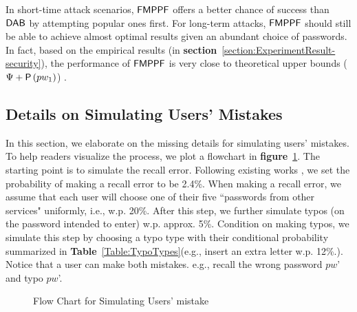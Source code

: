In short-time attack scenarios, $\mathsf{FMPPF}$ offers a better chance of success than $\mathsf{DAB}$ by attempting popular ones first. For long-term attacks, $\mathsf{FMPPF}$ should still be able to achieve almost optimal results given an abundant choice of passwords.  In fact, based on the empirical results (in \textbf{section}~\ref{section:ExperimentResult-security}), the performance of $\mathsf{FMPPF}$ is very close to theoretical upper bounds ($\Psi + \mathsf{P}\left(pw_1\right)$) . %




\subsection{Details on Simulating Users' Mistakes}\label{appendix:simulateMistakes}
In this section, we elaborate on the missing details for simulating users' mistakes. To help readers visualize the process, we plot a flowchart in \textbf{figure}~\ref{figure:flowChartTypo}. The starting point is to simulate the recall error. Following existing works \cite{CCS:CWPCR17,SP:CAAJR16}, we set the probability of making a recall error to be 2.4\%. When making a recall error, we assume that each user will choose one of their five ``passwords from other services" uniformly, i.e., w.p. 20\%. After this step, we further simulate typos (on the password intended to enter) w.p. approx. 5\%. Condition on making typos, we simulate this step by choosing a typo type with their conditional probability summarized in \textbf{Table}~\ref{Table:TypoTypes}(e.g., insert an extra letter w.p. 12\%.). Notice that a user can make both mistakes. e.g., recall the wrong password $pw$' and typo $pw$'.

\begin{figure}
	
	\caption{Flow Chart for Simulating Users' mistake}\label{figure:flowChartTypo}
\end{figure}


